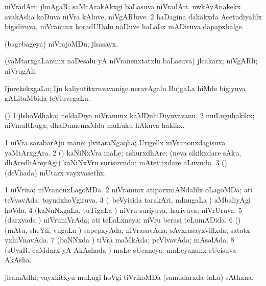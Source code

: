 {\bentry
{} 
\gl{\nA}
\expl{}
\bmng
\bnum
{} niVradAri; jlmAgaR: 
\banum
{} saMcArakAkxgi baLasuva niVradAri. 
 nwkAyAnakekx avakAsha koDuva niVra kAluve, niVgARluve. 
\eanum
\numie
\num{2} haDagina dakakxda Acetudiyalilx bigidiruva, niVranunx horadUDalu naDuve haLaLx mADiruva dapapxhalge. 
\enum
\emng
\eentry

\bentry
{} 
\gl{\nA}
\expl{}
\bmng
(bagebageya) niVrajoMDu; jlsasayx. 
\emng
\eentry

\bentry
{} 
\gl{\nA}
\expl{}
\bmng
(yaMtarxgaLanunx naDesalu yA niVranenxtatxlu baLasuva) jlcakarx; niVgARli; niVrugAli. 
\emng
\eentry

\bentry
{} 
\gl{\nA}
\expl{}
\bmng
IjurekekxgaLu; Iju kaliyutitxruvavanige neravAgalu BujgaLa hiMde bigiyuva gALituMbida teVluvegaLu. 
\emng
\eentry

\bentry
{} 
\gl{\nA}
\expl{}
\bmng
(\ame) 
\bnum
\num{1} jlshoVdhaka; neldaDiya niVranunx kaMDuhiDiyuvavanu. 
\num{2} muLuguhakikx; niVmuRLuga; dhaDumemxMdu muLuku hAkuva hakikx. 
\enum
\emng
\eentry

\bentry
{} 
\gl{\nA}
\expl{}
\bmng
\bnum
\num{1} niVra sarabarAju mane; jlvitaraNgaqha; Urigellx niVranonxdagisuva yaMtArxgAra. 
\num{2} (\ashi) kaNiNxVra maLe; ashurxdhAre; (neva sikikxdare sAku, dhAredhAreyAgi) kaNiNxVru surisuvudu; mAtetitxdare aLuvudu. 
\num{3} (\ashi) (deVhada) mUtarx vayxvasethx. 
\enum
\emng
\eentry

\bentry
{} 
\gl{\gu}
\expl{}
\bmng
\bnum
\num{1} niVrina; niVranonxLagoMDa. 
\num{2} niVranunx atiparxmANdalilx oLagoMDa; ati teVvavAda; toyudxhoVgiruva. 
\num{3} (\kanmu\ beVyisida tarakAri, mInugaLa \vi) aMbaliyAgi hoVda. 
\num{4} (kaNuNxgaLa, tuTigaLa \vi) niVru suriyuva, hariyuva; niVrUruva. 
\num{5} (darxvada \vi) niVruniVrAda; ati teLaLxneya; niVru berasi teLumADida. 
\num{6} (\rUpa) (mAtu, sheYli, \mo vugaLa \vi) sapepxyAda; niVrasavAda; sAvxrasayxvillxda; satatx vxhiVnavAda. 
\num{7} (baNNxda \vi) tiVra maMkAda; peVlvavAda; mAsalAda. 
\num{8} (sUyaR, caMdarx yA AkAshada \vi) maLe sUcaneya:  maLeyanunx sUcisuva AkAsha. 
\enum
\emng
\eentry

\bentry
{} 
\gl{\nA}
\expl{}
\bmng
jlsamAdhi; vayxkitxyu muLugi hoVgi tiVrikoMDa (samudarxda taLa) sAthxna. 
\emng
\eentry

}

